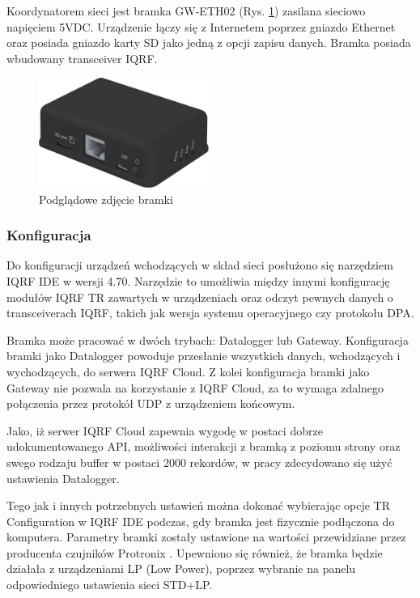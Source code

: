 Koordynatorem sieci jest bramka GW-ETH02 (Rys. \ref{bramka}) zasilana sieciowo napięciem 5VDC. Urządzenie łączy się z Internetem poprzez gniazdo Ethernet oraz
posiada gniazdo karty SD jako jedną z opcji zapisu danych. Bramka posiada wbudowany transceiver IQRF.

\begin{figure}[H]
    \centering
    \includegraphics[width=0.5\textwidth]{zdj/gateway.png}
    \caption{Podglądowe zdjęcie bramki \cite{gateway-product}}
    \label{bramka}
\end{figure}

\subsubsection{Konfiguracja}

Do konfiguracji urządzeń wchodzących w skład sieci posłużono się narzędziem IQRF IDE w wersji 4.70. Narzędzie to umożliwia między 
innymi konfigurację modułów IQRF TR zawartych w urządzeniach oraz odczyt pewnych danych o transceiverach IQRF, takich jak wersja systemu
operacyjnego czy protokołu DPA.

Bramka może pracować w dwóch trybach: Datalogger lub Gateway. Konfiguracja bramki jako Datalogger powoduje przesłanie wszystkich danych,
wchodzących i wychodzących, do serwera IQRF Cloud. Z kolei konfiguracja bramki jako Gateway nie pozwala na korzystanie z IQRF Cloud, za to wymaga 
zdalnego połączenia przez protokół UDP z urządzeniem końcowym.

Jako, iż serwer IQRF Cloud zapewnia wygodę w postaci dobrze udokumentowanego API, możliwości interakcji z bramką z poziomu strony oraz swego
rodzaju buffer w postaci 2000 rekordów, w pracy zdecydowano się użyć ustawienia Datalogger.

Tego jak i innych potrzebnych ustawień można dokonać wybierając opcje TR Configuration w IQRF IDE podczas, gdy bramka jest fizycznie podłączona
do komputera. Parametry bramki zostały ustawione na wartości przewidziane przez producenta czujników Protronix \cite{protronix-comms}. Upewniono 
się również, że bramka będzie działała z urządzeniami LP (Low Power), poprzez wybranie na panelu odpowiedniego ustawienia sieci STD+LP.

